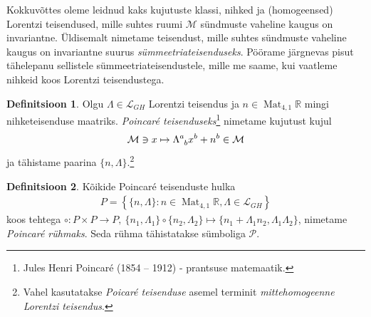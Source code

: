 \documentclass[12pt,a4paper,oneside]{article}
\theoremstyle{plain}
\theoremstyle{definition}
\newtheorem{definitsioon}{Definitsioon}[section]
\numberwithin{equation}{section}
\def\R{{\mathbb R}}
\def\L{{\mathcal L}}
\def\M{{\mathcal M}}
\def\P{{\mathcal P}}
\DeclareMathOperator{\Mat}{Mat}
\begin{document}
Kokkuvõttes oleme leidnud kaks kujutuste klassi, nihked ja 
(homogeensed) Lorentzi teisendused, mille suhtes ruumi $\M$ 
sündmuste vaheline kaugus on invariantne. Üldisemalt nimetame 
teisendust, mille suhtes sündmuste vaheline kaugus on invariantne 
suurus \emph{sümmeetriateisenduseks}. Pöörame järgnevas pisut 
tähelepanu sellistele sümmeetria\-teisendustele, mille me saame, kui 
vaatleme nihkeid koos Lorentzi teisendustega.

\begin{definitsioon}
Olgu $\Lambda \in \L_{GH}$ Lorentzi teisendus ja 
$n \in \Mat_{4, 1}\R$ mingi nihketeisenduse maatriks. 
\emph{Poincar\'e teisenduseks}\footnote{Jules Henri Poincaré 
(1854 – 1912) - prantsuse matemaatik.} nimetame kujutust kujul
\begin{align*}
\M \ni x \mapsto \Lambda\indices{^a_b} x^b + n^b \in \M
\end{align*}
ja tähistame paarina $\{n, \Lambda\}$.\footnote{Vahel 
kasutatakse \emph{Poicar\'e teisenduse} asemel terminit 
\emph{mittehomogeenne Lorentzi teisendus}.}
\end{definitsioon}

\begin{definitsioon} \textnormal{\cite{Barut}}
Kõikide Poincar\'e teisenduste hulka
\begin{align*}
P = \left\lbrace \{n, \Lambda\} : n \in \Mat_{4, 1}\R, \Lambda \in 
\L_{GH} \right\rbrace
\end{align*}
koos tehtega $\circ : P \times P \rightarrow P,\ \{n_1, \Lambda_1\} 
\circ \{n_2, \Lambda_2\} \mapsto \{n_1 + \Lambda_1 n_2, \Lambda_1 
\Lambda_2\}$, nimetame \emph{Poincar\'e rühmaks}. Seda rühma 
tähistatakse sümboliga $\P$.
\end{definitsioon}
\end{document}
